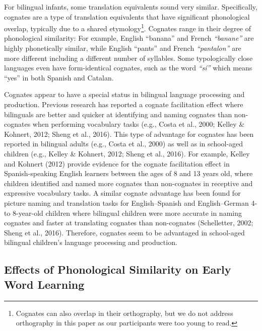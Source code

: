 \documentclass[
  ,man,floatsintext]{apa6}
\begin{document}
For bilingual infants, some translation equivalents sound very similar. Specifically, cognates are a type of translation equivalents that have significant phonological overlap, typically due to a shared etymology\footnote{Cognates can also overlap in their orthography, but we do not address orthography in this paper as our participants were too young to read.}. Cognates range in their degree of phonological similarity: For example, English ``banana''  and French \emph{``banane''}  are highly phonetically similar, while English ``pants''  and French \emph{``pantalon''}  are more different including a different number of syllables. Some typologically close languages even have form-identical cognates, such as the word \emph{``sí''}  which means ``yes'' in both Spanish and Catalan.

Cognates appear to have a special status in bilingual language processing and production. Previous research has reported a cognate facilitation effect where bilinguals are better and quicker at identifying and naming cognates than non-cognates when performing vocabulary tasks (e.g., Costa et al., 2000; Kelley \& Kohnert, 2012; Sheng et al., 2016). This type of advantage for cognates has been reported in bilingual adults (e.g., Costa et al., 2000) as well as in school-aged children (e.g., Kelley \& Kohnert, 2012; Sheng et al., 2016). For example, Kelley and Kohnert (2012) provide evidence for the cognate facilitation effect in Spanish-speaking English learners between the ages of 8 and 13 years old, where children identified and named more cognates than non-cognates in receptive and expressive vocabulary tasks. A similar cognate advantage has been found for picture naming and translation tasks for English--Spanish and English--German 4- to 8-year-old children where bilingual children were more accurate in naming cognates and faster at translating cognates than non-cognates (Schelletter, 2002; Sheng et al., 2016). Therefore, cognates seem to be advantaged in school-aged bilingual children's language processing and production.

\hypertarget{effects-of-phonological-similarity-on-early-word-learning}{%
\subsection{Effects of Phonological Similarity on Early Word Learning}\label{effects-of-phonological-similarity-on-early-word-learning}}
\end{document}
